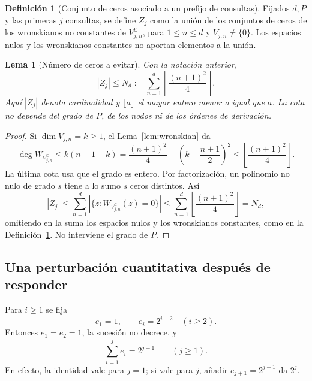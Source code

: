 \documentclass[11pt,a4paper]{article}
\numberwithin{equation}{section}
\newtheorem{lemma}[theorem]{Lema}
\theoremstyle{definition}
\newtheorem{definition}[theorem]{Definición}
\theoremstyle{remark}
\newcommand{\C}{\mathbb C}
\begin{document}
\begin{definition}[Conjunto de ceros asociado a un prefijo de consultas]\label{def:zeros}
Fijados $d,P$ y las primeras $j$ consultas, se define $Z_j$ como la unión de los conjuntos de ceros de los wronskianos no constantes de $V_{j,n}^{\C}$, para $1\le n\le d$ y $V_{j,n}\ne\{0\}$. Los espacios nulos y los wronskianos constantes no aportan elementos a la unión.
\end{definition}

\begin{lemma}[Número de ceros a evitar]\label{lem:zerocount}
Con la notación anterior,
\begin{equation}\label{eq:zerocount}
|Z_j|\le N_d:=\sum_{n=1}^d\left\lfloor\frac{(n+1)^2}{4}\right\rfloor.
\end{equation}
Aquí $|Z_j|$ denota cardinalidad y $\lfloor a\rfloor$ el mayor entero menor o igual que $a$. La cota no depende del grado de $P$, de los nodos ni de los órdenes de derivación.
\end{lemma}
\begin{proof}
Si $\dim V_{j,n}=k\ge1$, el Lema~\ref{lem:wronskian} da
\[
\deg W_{V_{j,n}^{\C}}\le k(n+1-k)
=\frac{(n+1)^2}{4}-\left(k-\frac{n+1}2\right)^2
\le\left\lfloor\frac{(n+1)^2}{4}\right\rfloor.
\]
La última cota usa que el grado es entero. Por factorización, un polinomio no nulo de grado $s$ tiene a lo sumo $s$ ceros distintos. Así
\[
|Z_j|\le\sum_{n=1}^d|\{z:W_{V_{j,n}^{\C}}(z)=0\}|
\le\sum_{n=1}^d\left\lfloor\frac{(n+1)^2}{4}\right\rfloor=N_d,
\]
omitiendo en la suma los espacios nulos y los wronskianos constantes, como en la Definición~\ref{def:zeros}. No interviene el grado de $P$.
\end{proof}

\subsection{Una perturbación cuantitativa después de responder}
Para $i\ge1$ se fija
\begin{equation}\label{eq:exponents}
e_1=1,\qquad e_i=2^{i-2}\quad(i\ge2).
\end{equation}
Entonces $e_1=e_2=1$, la sucesión no decrece, y
\begin{equation}\label{eq:sumexponents}
\sum_{i=1}^je_i=2^{j-1}\qquad(j\ge1).
\end{equation}
En efecto, la identidad vale para $j=1$; si vale para $j$, añadir $e_{j+1}=2^{j-1}$ da $2^j$.
\end{document}
